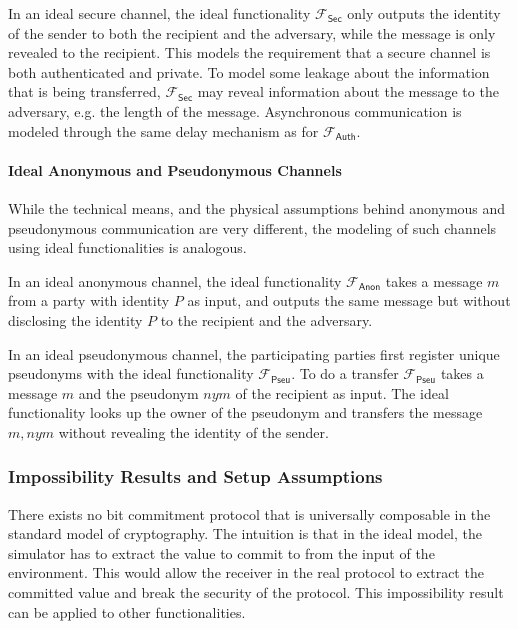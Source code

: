\documentclass{article}
\begin{document}
In an ideal secure channel, the ideal functionality $\mathcal{F}_{\mathsf{Sec}}$
only outputs the identity of the sender to both the recipient and the adversary,
while the message is only revealed to the recipient. This models the requirement
that a secure channel is both authenticated and private. To model some leakage
about the information that is being transferred, $\mathcal{F}_{\mathsf{Sec}}$
may reveal information about the message to the adversary, e.g. the length of
the message. Asynchronous communication is modeled through the same delay
mechanism as for $\mathcal{F}_{\mathsf{Auth}}$.

\paragraph{Ideal Anonymous and Pseudonymous Channels}

While the technical means, and the physical assumptions behind anonymous and
pseudonymous communication are very different, the modeling of such channels
using ideal functionalities is analogous.

In an ideal anonymous channel, the ideal functionality $\mathcal{F}_{\mathsf{Anon}}$
takes a message $m$ from a party with identity $P$ as input, and outputs the
same message but without disclosing the identity $P$ to the recipient and the
adversary.

In an ideal pseudonymous channel, the participating parties first register
unique pseudonyms with the ideal functionality $\mathcal{F}_{\mathsf{Pseu}}$. To
do a transfer $\mathcal{F}_{\mathsf{Pseu}}$ takes a message $m$ and the
pseudonym $nym$ of the recipient as input. The ideal functionality looks up the
owner of the pseudonym and transfers the message $m,nym$ without revealing the
identity of the sender.

\subsubsection{Impossibility Results and Setup Assumptions}

There exists no bit commitment protocol that is universally composable in the
standard model of cryptography. The intuition is that in the ideal model, the
simulator has to extract the value to commit to from the input of the
environment. This would allow the receiver in the real protocol to extract the
committed value and break the security of the protocol. This impossibility
result can be applied to other functionalities.
\end{document}
